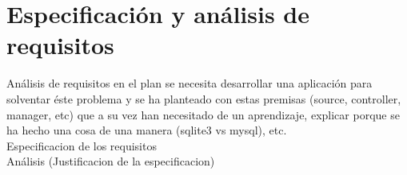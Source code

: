 \chapter{Especificación y análisis de requisitos}
\label{chap:requisitos}

Análisis de requisitos en el plan se necesita desarrollar una aplicación para solventar éste problema y se ha planteado con estas premisas (source, controller, manager, etc) que a su vez han necesitado de un aprendizaje, explicar porque se ha hecho una cosa de una manera (sqlite3 vs mysql), etc.\\

Especificacion de los requisitos\\
Análisis (Justificacion de la especificacion)\\
